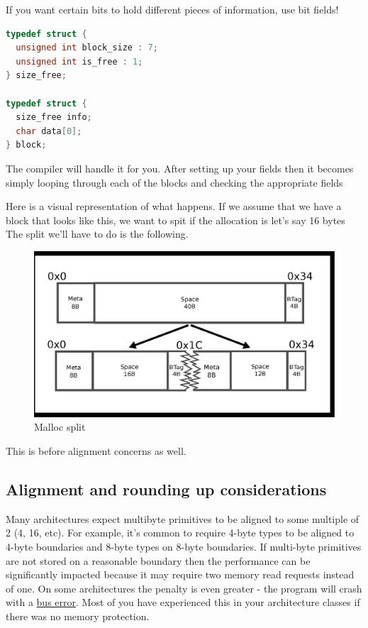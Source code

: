 If you want certain bits to hold different pieces of information, use bit fields!

\begin{lstlisting}[language=C]
typedef struct {
  unsigned int block_size : 7;
  unsigned int is_free : 1;
} size_free;

typedef struct {
  size_free info;
  char data[0];
} block;
\end{lstlisting}

The compiler will handle it for you.
After setting up your fields then it becomes simply looping through each of the blocks and checking the appropriate fields

Here is a visual representation of what happens.
If we assume that we have a block that looks like this, we want to spit if the allocation is let's say 16 bytes
The split we'll have to do is the following.

\begin{figure}[H]
\centering
\includegraphics[width=.7\textwidth]{malloc/drawings/malloc_split.eps}
\caption{Malloc split}
\end{figure}

This is before alignment concerns as well.

\subsection{Alignment and rounding up considerations}

Many architectures expect multibyte primitives to be aligned to some multiple of 2 (4, 16, etc).
For example, it's common to require 4-byte types to be aligned to 4-byte boundaries and 8-byte types on 8-byte boundaries.
If multi-byte primitives are not stored on a reasonable boundary then the performance can be significantly impacted because it may require two memory read requests instead of one.
On some architectures the penalty is even greater - the program will crash with a \href{http://en.wikipedia.org/wiki/Bus_error\#Unaligned_access}{bus error}.
Most of you have experienced this in your architecture classes if there was no memory protection.

